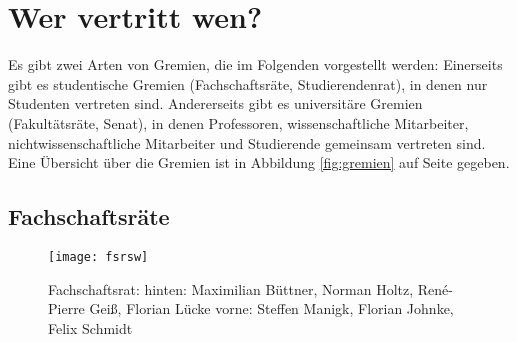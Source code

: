 
\section{Wer vertritt wen?}
\label{vertretung}

Es gibt zwei Arten von Gremien, die im Folgenden vorgestellt werden: Einerseits gibt es studentische Gremien (Fachschaftsräte, Studierendenrat), in denen nur Studenten vertreten sind. Andererseits gibt es universitäre Gremien (Fakultätsräte, Senat), in denen Professoren, wissenschaftliche Mitarbeiter, nichtwissenschaftliche Mitarbeiter und Studierende gemeinsam vertreten sind.
Eine Übersicht über die Gremien ist in Abbildung \ref{fig:gremien} auf Seite \pageref{fig:gremien} gegeben.

\subsection{Fachschaftsräte}

\begin{figure}[!t]
    \centering
    \texttt{[image: fsrsw]}
    \caption{Fachschaftsrat: hinten: Maximilian Büttner, Norman Holtz, René-Pierre Geiß, Florian Lücke vorne: Steffen Manigk, Florian Johnke, Felix Schmidt}
             \label{fig:fsr}
\end{figure}

